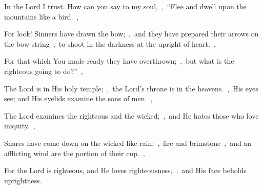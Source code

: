 \documentclass[12pt,twoside,a5paper]{article}
\begin{document}





\begin{normalparskip}
  In the Lord I trust. How can you say to my soul,~\sep\ ``Flee and dwell upon the mountains like a bird.~\sep


  For look! Sinners have drawn the bow;~\sep\ and they have prepared their arrows on the bow-string~\sep\ to shoot in the darkness at the upright of heart.~\sep

  For that which You made ready they have overthrown;~\sep\ but what is the righteous going to do?''~\sep

  The Lord is in His holy temple;~\sep\ the Lord's throne is in the heavens.~\sep\ His eyes see; and His eyelids examine the sons of men.~\sep

  The Lord examines the righteous and the wicked;~\sep\ and He hates those who love iniquity.~\sep

  Snares have come down on the wicked like rain;~\sep\ fire and brimstone~\sep\ and an afflicting wind are the portion of their cup.~\sep

  For the Lord is righteous, and He loves righteousness,~\sep\ and His face beholds uprightness.
\end{normalparskip}

\end{document}
